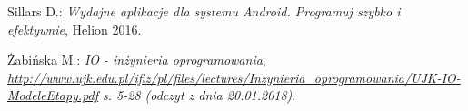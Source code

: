 \begin{thebibliography}{99}
    	 Sillars D.:
    	 \textit{Wydajne aplikacje dla systemu Android. Programuj szybko i efektywnie}, 
    	 Helion 2016.
    	 
    	 Żabińska M.: \textit{IO - inżynieria oprogramowania},\\
    	 \textit{\href{http://www.ujk.edu.pl/ifiz/pl/files/lectures/Inzynieria\_oprogramowania/UJK-IO-ModeleEtapy.pdf}{http://www.ujk.edu.pl/ifiz/pl/files/lectures/Inzynieria\_oprogramowania/UJK-IO-ModeleEtapy.pdf} s. 5-28 (odczyt z dnia 20.01.2018)}.
     \end{thebibliography}
 
